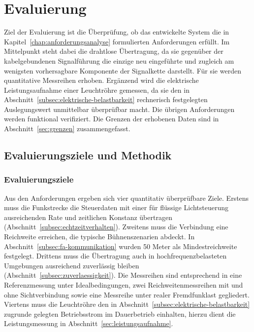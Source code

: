 \chapter{Evaluierung}
\label{chap:evaluierung}

Ziel der Evaluierung ist die Überprüfung, ob das entwickelte System die in
Kapitel~\ref{chap:anforderungsanalyse} formulierten Anforderungen erfüllt. Im
Mittelpunkt steht dabei die drahtlose Übertragung, da sie gegenüber der
kabelgebundenen Signalführung die einzige neu eingeführte und zugleich am
wenigsten vorhersagbare Komponente der Signalkette darstellt. Für sie werden
quantitative Messreihen erhoben. Ergänzend wird die elektrische
Leistungsaufnahme einer Leuchtröhre gemessen, da sie den in
Abschnitt~\ref{subsec:elektrische-belastbarkeit} rechnerisch festgelegten
Auslegungswert unmittelbar überprüfbar macht. Die übrigen Anforderungen werden
funktional verifiziert. Die Grenzen der erhobenen Daten sind in
Abschnitt~\ref{sec:grenzen} zusammengefasst.

\section{Evaluierungsziele und Methodik}
\label{sec:evaluierungsziele}

\subsection{Evaluierungsziele}
\label{subsec:evaluierungsziele-ableitung}

Aus den Anforderungen ergeben sich vier quantitativ überprüfbare Ziele. Erstens
muss die Funkstrecke die Steuerdaten mit einer für flüssige Lichtsteuerung
ausreichenden Rate und zeitlichen Konstanz übertragen
(Abschnitt~\ref{subsec:echtzeitverhalten}). Zweitens muss die Verbindung eine
Reichweite erreichen, die typische Bühnenszenarien abdeckt.
In Abschnitt~\ref{subsec:fa-kommunikation} wurden 50 Meter als Mindestreichweite festgelegt. 
Drittens muss die Übertragung auch in
hochfrequenzbelasteten Umgebungen ausreichend zuverlässig bleiben
(Abschnitt~\ref{subsec:zuverlaessigkeit}). Die Messreihen sind entsprechend in
eine Referenzmessung unter Idealbedingungen, zwei Reichweitenmessreihen mit und
ohne Sichtverbindung sowie eine Messreihe unter realer Fremdfunklast gegliedert.
Viertens muss die Leuchtröhre den in
Abschnitt~\ref{subsec:elektrische-belastbarkeit} zugrunde gelegten Betriebsstrom
im Dauerbetrieb einhalten, hierzu dient die Leistungsmessung in
Abschnitt~\ref{sec:leistungsaufnahme}.

